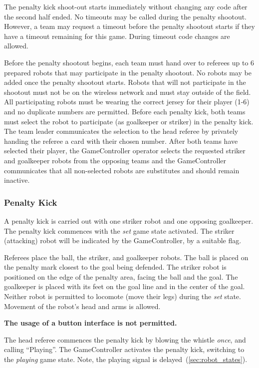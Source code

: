 The penalty kick shoot-out starts immediately without changing any code after the second half ended. No timeouts may be called during the penalty shootout. However, a team may request a timeout before the penalty shootout starts if they have a timeout remaining for this game. During timeout code changes are allowed.

Before the penalty shootout begins, each team must hand over to referees up to 6 prepared robots that may participate in the penalty shootout. No robots may be added once the penalty shootout starts. Robots that will not participate in the shootout must not be on the wireless network and must stay outside of the field. All participating robots must be wearing the correct jersey for their player (1-6) and no duplicate numbers are permitted. Before each penalty kick, both teams must select the robot to participate (as goalkeeper or striker) in the penalty kick. The team leader communicates the selection to the head referee by privately handing the referee a card with their chosen number. After both teams have selected their player, the GameController operator selects the requested striker and goalkeeper robots from the opposing teams and the GameController communicates that all non-selected robots are substitutes and should remain inactive.

\subsubsection{Penalty Kick}
\label{sec:penalty_kick}

A penalty kick is carried out with one striker robot and one opposing goalkeeper.
The penalty kick commences with the \textit{set} game state activated.
The striker (attacking) robot will be indicated by the GameController, by a suitable flag.

Referees place the ball, the striker, and goalkeeper robots. The ball is placed on the penalty mark closest to the goal being defended. The striker robot is positioned on the edge of the penalty area, facing the ball and the goal. The goalkeeper is placed with its feet on the goal line and in the center of the goal. Neither robot is permitted to locomote (move their legs) during the \textit{set} state. Movement of the robot's head and arms is allowed.

\textbf{The usage of a button interface is not permitted.}

The head referee commences the penalty kick by blowing the whistle \textit{once}, and calling ``Playing''.
The GameController activates the penalty kick, switching to the \emph{playing} game state.
Note, the playing signal is delayed~(\cf \cref{sec:robot_states}).

